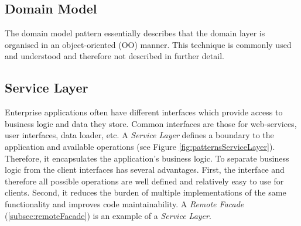 		\subsection{Domain Model}
		\label{subsec:domainModel}
			The domain model pattern essentially describes that the domain layer
			is organised in an object-oriented (OO) manner. This technique is commonly
			used and understood and therefore not described in further detail. 
			
		\subsection{Service Layer}
		\label{subsec:serviceLayer}
			Enterprise applications often have different interfaces which provide access to
			business logic and data they store. Common interfaces are those for web-services,
			user interfaces, data loader, etc. A \textit{Service Layer} defines a boundary to
			the application and available operations (see Figure \ref{fig:patternsServiceLayer}). 
			Therefore, it encapsulates the application's business logic. To separate business 
			logic from the client interfaces has several advantages. First, the interface and therefore all
			possible operations are well defined and relatively easy to use for clients. Second,
			it reduces the burden of multiple implementations of the same functionality and improves code
			maintainability. A \textit{Remote Facade} (\ref{subsec:remoteFacade}) is an 
			example of a \textit{Service Layer}.
			
